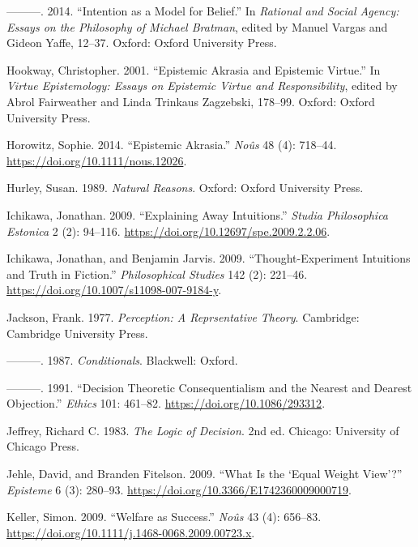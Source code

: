 \documentclass[
  10pt,
  letterpaper,
  twoside]{scrbook}
\newlength{\cslhangindent}
\newenvironment{CSLReferences}[2] %
 {\begin{list}{}{%
  \setlength{\itemindent}{0pt}
  \setlength{\leftmargin}{0pt}
  \setlength{\parsep}{0pt}
  \ifodd #1
   \setlength{\leftmargin}{\cslhangindent}
   \setlength{\itemindent}{-1\cslhangindent}
  \fi
  \setlength{\itemsep}{#2\baselineskip}}}
 {\end{list}}
\begin{document}
\begin{CSLReferences}{1}{0}
---------. 2014. {``Intention as a Model for Belief.''} In
\emph{Rational and Social Agency: Essays on the Philosophy of Michael
Bratman}, edited by Manuel Vargas and Gideon Yaffe, 12--37. Oxford:
Oxford University Press.

Hookway, Christopher. 2001. {``Epistemic Akrasia and Epistemic
Virtue.''} In \emph{Virtue Epistemology: Essays on Epistemic Virtue and
Responsibility}, edited by Abrol Fairweather and Linda Trinkaus
Zagzebski, 178--99. Oxford: Oxford University Press.

Horowitz, Sophie. 2014. {``Epistemic Akrasia.''} \emph{No{û}s} 48 (4):
718--44. \url{https://doi.org/10.1111/nous.12026}.

Hurley, Susan. 1989. \emph{Natural Reasons}. Oxford: Oxford University
Press.

Ichikawa, Jonathan. 2009. {``Explaining Away Intuitions.''} \emph{Studia
Philosophica Estonica} 2 (2): 94--116.
\url{https://doi.org/10.12697/spe.2009.2.2.06}.

Ichikawa, Jonathan, and Benjamin Jarvis. 2009. {``Thought-Experiment
Intuitions and Truth in Fiction.''} \emph{Philosophical Studies} 142
(2): 221--46. \url{https://doi.org/10.1007/s11098-007-9184-y}.

Jackson, Frank. 1977. \emph{Perception: A Reprsentative Theory}.
Cambridge: Cambridge University Press.

---------. 1987. \emph{Conditionals}. Blackwell: Oxford.

---------. 1991. {``Decision Theoretic Consequentialism and the Nearest
and Dearest Objection.''} \emph{Ethics} 101: 461--82.
\url{https://doi.org/10.1086/293312}.

Jeffrey, Richard C. 1983. \emph{The Logic of Decision}. 2nd ed. Chicago:
University of Chicago Press.

Jehle, David, and Branden Fitelson. 2009. {``What Is the {`Equal Weight
View'}?''} \emph{Episteme} 6 (3): 280--93.
\url{https://doi.org/10.3366/E1742360009000719}.

Keller, Simon. 2009. {``Welfare as Success.''} \emph{No{û}s} 43 (4):
656--83. \url{https://doi.org/10.1111/j.1468-0068.2009.00723.x}.


\end{CSLReferences}
\end{document}
